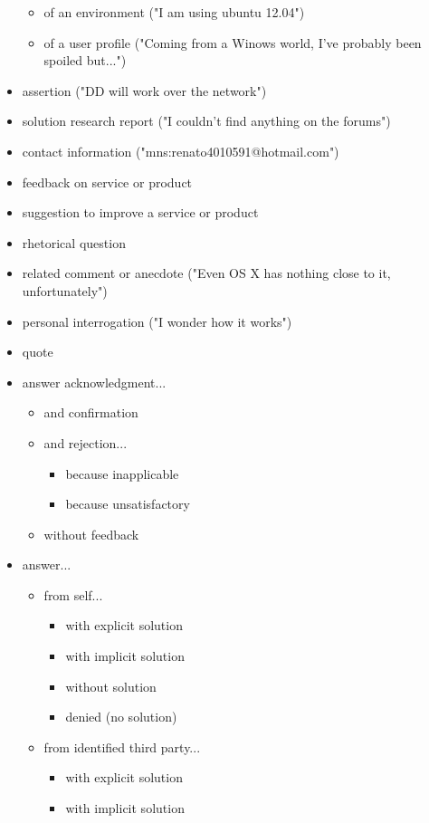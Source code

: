 \documentclass[11pt]{article}
\begin{document}
\begin{itemize}
\begin{itemize}
			\item of an environment ("I am using ubuntu 12.04")
			\item of a user profile ("Coming from a Winows world, I've probably been spoiled but...")
		\end{itemize}
	\item assertion ("DD will work over the network")
	\item solution research report ("I couldn't find anything on the forums")
	\item contact information ("mns:renato4010591@hotmail.com")
	\item feedback on service or product
	\item suggestion to improve a service or product
	\item rhetorical question
	\item related comment or anecdote ("Even OS X has nothing close to it, unfortunately")
	\item personal interrogation ("I wonder how it works")
	\item quote
	\item answer acknowledgment...
		\begin{itemize}
			\item and confirmation
			\item and rejection...
			\begin{itemize}
				\item because inapplicable
				\item because unsatisfactory
			\end{itemize}
			\item without feedback
		\end{itemize}
	\item answer...
		\begin{itemize}
			\item from self...
				\begin{itemize}
					\item with explicit solution
					\item with implicit solution
					\item without solution
					\item denied (no solution)
				\end{itemize}
			\item from identified third party...
				\begin{itemize}
					\item with explicit solution
					\item with implicit solution

\end{itemize}
\end{itemize}
\end{itemize}
\end{document}

